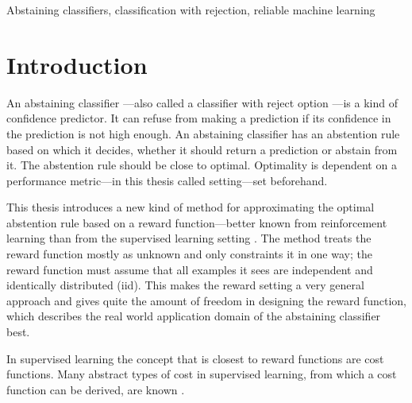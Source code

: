 \documentclass[twoside,11pt]{article}
\begin{document}
\begin{keywords}
Abstaining classifiers, classification with rejection,
reliable machine learning
\end{keywords}

\vfill
\hspace{0pt}

\newpage

\tableofcontents

\newpage

\listoffigures

\newpage

\listoftables

\newpage


\section{Introduction}
\label{sec:intro}

An abstaining classifier
\citep[see e.g.][]{vanderlooy_et_al_2009}---also called a
classifier with reject option
\citep[see e.g.][]{fisher_et_al_2016}---is a kind
of confidence predictor.
It can refuse from making a prediction if its confidence in
the prediction is not high enough.
An abstaining classifier has an abstention rule based on
which it decides, whether it should return a prediction
or abstain from it.
The abstention rule should be close to optimal.
Optimality is dependent on a performance metric---in this
thesis called setting---set beforehand.

This thesis introduces a new kind of method for
approximating the optimal abstention rule based on a reward
function---better known from reinforcement learning than
from the supervised learning setting
\citep[see e.g.][Chapter 1]{sutton_et_al_2018}.
The method treats the reward function mostly as unknown and
only constraints it in one way; the reward function must
assume that all examples it sees are independent and
identically distributed (iid).
This makes the reward setting a very general approach and
gives quite the amount of freedom in designing the reward
function, which describes the real world application domain
of the abstaining classifier best.

In supervised learning the concept that is closest to
reward functions are cost functions. Many abstract types
of cost in supervised learning, from which a cost function
can be derived, are known
\citep[see][]{turney_2000}.
\end{document}
